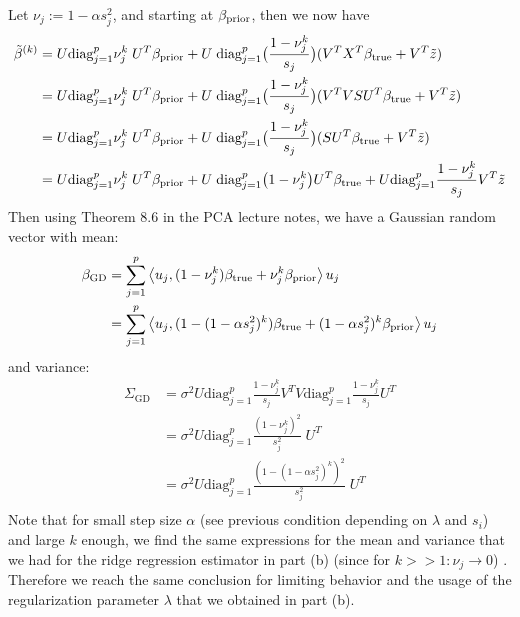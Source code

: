 \documentclass[12pt,twoside]{article}
\begin{document}
\begin{enumerate}
\begin{enumerate}
Let $\nu_j := 1 - \alpha s_j^2$, and starting at $ \beta_{\operatorname{prior}}$, then we now have
\begin{align*}
	\tilde{ \beta }^{(k)} 	&= 	  U \text{diag}_{j=1}^p   \nu_j^k \; U^T   \beta_{\operatorname{prior}} + U \;    \text{diag}_{j=1}^p \big(  \frac{ 1 - \nu_j^k} {s_j}  \big) (V^T X^T  \beta_{\operatorname{true}}  + V^T  \tilde{ z })\\
					&= 	  U \text{diag}_{j=1}^p   \nu_j^k \; U^T   \beta_{\operatorname{prior}} + U \;    \text{diag}_{j=1}^p \big(  \frac{ 1 - \nu_j^k} {s_j}  \big) (V^T V S U^T \beta_{\operatorname{true}}  + V^T  \tilde{ z })\\
					&= 	  U \text{diag}_{j=1}^p   \nu_j^k \; U^T   \beta_{\operatorname{prior}} + U \;    \text{diag}_{j=1}^p \big(  \frac{ 1 - \nu_j^k} {s_j}  \big) (S U^T \beta_{\operatorname{true}}  + V^T  \tilde{ z })\\
					&= 	  U \text{diag}_{j=1}^p   \nu_j^k \; U^T   \beta_{\operatorname{prior}} + U \;      \text{diag}_{j=1}^p \big( 1 - \nu_j^k \big)  U^T \beta_{\operatorname{true}} + U  \text{diag}_{j=1}^p \frac{ 1 - \nu_j^k} {s_j}  V^T  \tilde{ z }
\end{align*}	
 Then using Theorem 8.6 in the PCA lecture notes, we have a Gaussian random vector  with mean:
\begin{align*}
	\beta_{\text{GD}} 		&= \sum_{j=1}^p \left \langle u_j, (1 - \nu_j^k)  \beta_{\operatorname{true}} + \nu_j^k \beta_{\operatorname{prior}} \right \rangle u_j \\
						&= \sum_{j=1}^p \left \langle u_j, (1 - (1 - \alpha s_j^2)^k) \beta_{\operatorname{true}} + (1 - \alpha s_j^2)^k \beta_{\operatorname{prior}} \right \rangle u_j \\
\end{align*}
and variance:
\begin{align*} 
	\Sigma_{\text{GD}}			&= \sigma^2 U  \text{diag}_{j=1}^p \frac{1 - \nu_j^k} {s_j}  V^T V  \text{diag}_{j=1}^p \frac{ 1 - \nu_j^k} {s_j}  U^T \\
							&= \sigma^2 U   \text{diag}_{j=1}^p \frac{(1 - \nu_j^k)^2} {s_j^2} \; U^T \\
							&= \sigma^2 U   \text{diag}_{j=1}^p \frac{ (1 - (1 - \alpha s_j^2)^k)^2}  {s_j^2} \; U^T \\
\end{align*}
 Note that for small step size $\alpha$ (see previous condition depending on $\lambda$ and $s_i$) and large $k$  enough, 
 we find the same expressions for the mean and variance that we had  for the ridge regression estimator in part (b) (since for $k >> 1: \nu_j \rightarrow 0$) .
 Therefore  we reach the same conclusion for limiting behavior and the usage of the regularization parameter $\lambda$ that we obtained in part (b).
 

\end{enumerate}
\end{enumerate}
\end{document}
